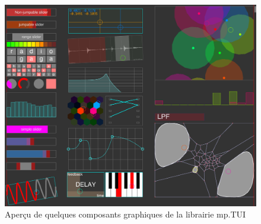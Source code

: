 \begin{figure}[htb]
	\includegraphics[width=\textwidth]{gfx/mpTUI/mp-TUI-preview.png}
	\caption{Aperçu de quelques composants graphiques de la librairie mp.TUI}
	\label{fig:visual_representation:mp.TUI}
\end{figure}

